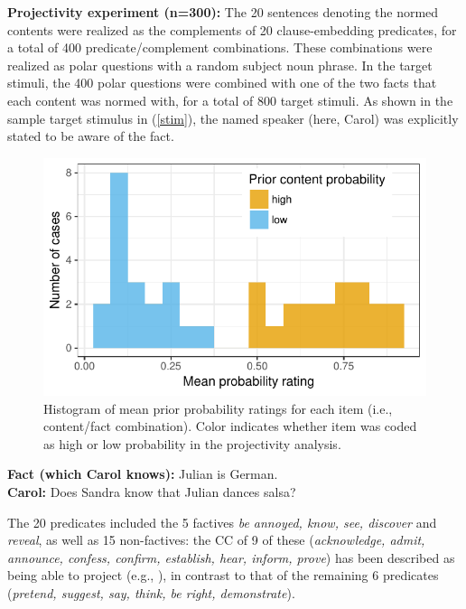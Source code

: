 \documentclass[12pt,fleqn]{article}
\newcommand{\6}{\mbox{$[\hspace*{-.6mm}[$}}
\newcommand{\9}{\mbox{$]\hspace*{-.6mm}]$}}
\begin{document}
\noindent 
{\bf Projectivity experiment (n=300):} The 20 sentences denoting the normed contents were realized as the complements of 20 clause-embedding predicates, for a total of 400 predicate/complement combinations. These combinations were realized as polar questions with a random subject noun phrase. In the target stimuli, the 400 polar questions were combined with one of the two facts that each content was normed with, for a total of 800 target stimuli. As shown in the sample target stimulus in (\ref{stim}), the named speaker (here, Carol) was explicitly stated to be aware of the fact.
\vspace*{-.6cm}
\begin{figure}
\centering
\includegraphics[width=.32\paperwidth]{../results/1-prior/graphs/meanprobratings}
\caption{Histogram of mean prior probability ratings for each item (i.e., content/fact combination). Color indicates whether item was coded as high or low probability in the projectivity analysis.}\label{f-prior}
\end{figure}%
\begin{exe}
\ex\label{stim}
{\bf Fact (which Carol knows):} Julian is German.  \\ 
{\bf Carol:} Does Sandra know that Julian dances salsa?
\end{exe}
\vspace*{-.15cm}
The 20 predicates included the 5 factives {\em be annoyed, know, see, discover} and {\em reveal}, as well as 15 non-factives: the CC of 9 of these ({\em acknowledge, admit, announce, confess, confirm, establish, hear, inform, prove}) has been described as being able to project (e.g., \citealt{schlenker10,anand-hacquard2014,spector-egre2015,tbd-variability}), in contrast to that of the remaining 6 predicates ({\em pretend, suggest, say, think, be right, demonstrate}).
\end{document}
